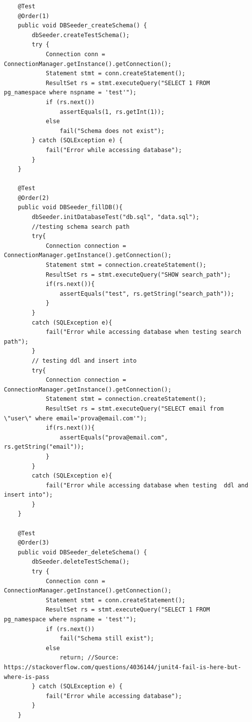 \begin{code}
    \begin{verbatim}
    @Test
    @Order(1)
    public void DBSeeder_createSchema() {
        dbSeeder.createTestSchema();
        try {
            Connection conn = ConnectionManager.getInstance().getConnection();
            Statement stmt = conn.createStatement();
            ResultSet rs = stmt.executeQuery("SELECT 1 FROM pg_namespace where nspname = 'test'");
            if (rs.next())
                assertEquals(1, rs.getInt(1));
            else
                fail("Schema does not exist");
        } catch (SQLException e) {
            fail("Error while accessing database");
        }
    }

    @Test
    @Order(2)
    public void DBSeeder_fillDB(){
        dbSeeder.initDatabaseTest("db.sql", "data.sql");
        //testing schema search path
        try{
            Connection connection = ConnectionManager.getInstance().getConnection();
            Statement stmt = connection.createStatement();
            ResultSet rs = stmt.executeQuery("SHOW search_path");
            if(rs.next()){
                assertEquals("test", rs.getString("search_path"));
            }
        }
        catch (SQLException e){
            fail("Error while accessing database when testing search path");
        }
        // testing ddl and insert into
        try{
            Connection connection = ConnectionManager.getInstance().getConnection();
            Statement stmt = connection.createStatement();
            ResultSet rs = stmt.executeQuery("SELECT email from \"user\" where email='prova@email.com'");
            if(rs.next()){
                assertEquals("prova@email.com", rs.getString("email"));
            }
        }
        catch (SQLException e){
            fail("Error while accessing database when testing  ddl and insert into");
        }
    }
    
    @Test
    @Order(3)
    public void DBSeeder_deleteSchema() {
        dbSeeder.deleteTestSchema();
        try {
            Connection conn = ConnectionManager.getInstance().getConnection();
            Statement stmt = conn.createStatement();
            ResultSet rs = stmt.executeQuery("SELECT 1 FROM pg_namespace where nspname = 'test'");
            if (rs.next())
                fail("Schema still exist");
            else
                return; //Source: https://stackoverflow.com/questions/4036144/junit4-fail-is-here-but-where-is-pass
        } catch (SQLException e) {
            fail("Error while accessing database");
        }
    }

    \end{verbatim}
    \caption{Test case da DBSeederTest}
\end{code}
